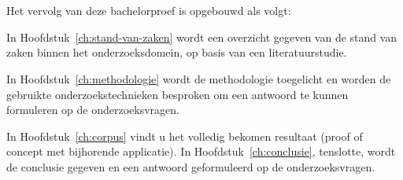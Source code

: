 \section{}
\label{sec:opzet-bachelorproef}


Het vervolg van deze bachelorproef is opgebouwd als volgt:

In Hoofdstuk~\ref{ch:stand-van-zaken} wordt een overzicht gegeven van de stand van zaken binnen het onderzoeksdomein, op basis van een literatuurstudie.

In Hoofdstuk~\ref{ch:methodologie} wordt de methodologie toegelicht en worden de gebruikte onderzoekstechnieken besproken om een antwoord te kunnen formuleren op de onderzoeksvragen.


In Hoofdstuk~\ref{ch:corpus} vindt u het volledig bekomen resultaat (proof of concept met bijhorende applicatie).
\newline
\newline
In Hoofdstuk~\ref{ch:conclusie}, tenslotte, wordt de conclusie gegeven en een antwoord geformuleerd op de onderzoeksvragen.